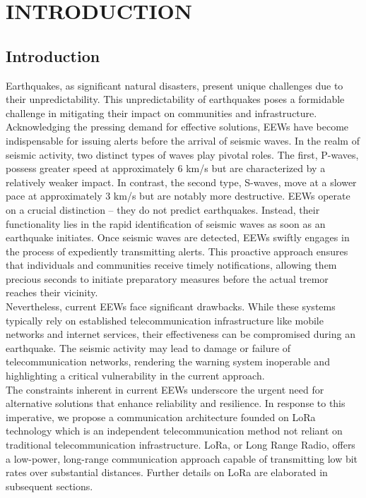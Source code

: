 \chapter{INTRODUCTION}

\section{Introduction}
\hspace{12pt} Earthquakes, as significant natural disasters, present unique challenges due to their unpredictability. This unpredictability of earthquakes poses a formidable challenge in mitigating their impact on communities and infrastructure. Acknowledging the pressing demand for effective solutions, \ac{EEWs} have become indispensable for issuing alerts before the arrival of seismic waves. In the realm of seismic activity, two distinct types of waves play pivotal roles. The first, P-waves, possess greater speed at approximately 6 km/s but are characterized by a relatively weaker impact. In contrast, the second type, S-waves, move at a slower pace at approximately 3 km/s but are notably more destructive. \ac{EEWs} operate on a crucial distinction – they do not predict earthquakes. Instead, their functionality lies in the rapid identification of seismic waves as soon as an earthquake initiates. Once seismic waves are detected, \ac{EEWs} swiftly engages in the process of expediently transmitting alerts. This proactive approach ensures that individuals and communities receive timely notifications, allowing them precious seconds to initiate preparatory measures before the actual tremor reaches their vicinity.\\

Nevertheless, current \ac{EEWs} face significant drawbacks. While these systems typically rely on established telecommunication infrastructure like mobile networks and internet services, their effectiveness can be compromised during an earthquake. The seismic activity may lead to damage or failure of telecommunication networks, rendering the warning system inoperable and highlighting a critical vulnerability in the current approach.\\

The constraints inherent in current \ac{EEWs} underscore the urgent need for alternative solutions that enhance reliability and resilience. In response to this imperative, we propose a communication architecture founded on LoRa technology which is an independent telecommunication method not reliant on traditional telecommunication infrastructure. LoRa, or Long Range Radio, offers a low-power, long-range communication approach capable of transmitting low bit rates over substantial distances. Further details on LoRa are elaborated in subsequent sections.\\

